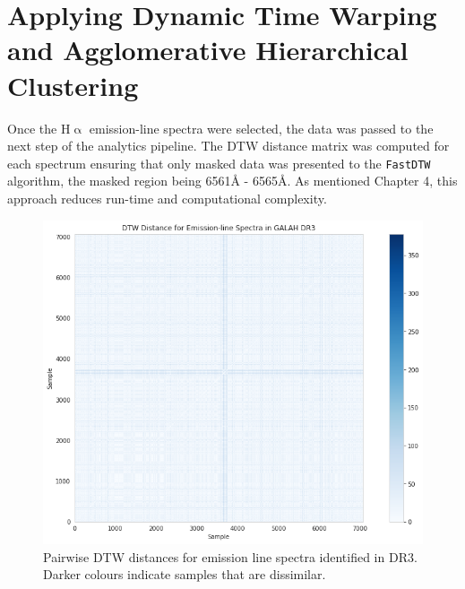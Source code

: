 \section{Applying Dynamic Time Warping and Agglomerative Hierarchical Clustering}

Once the H$\upalpha$ emission-line spectra were selected, the data was passed to the next step of the analytics pipeline. The DTW distance matrix was computed for each spectrum ensuring that only masked data was presented to the \texttt{FastDTW} algorithm, the masked region being 6561\r{A} - 6565\r{A}\cite{traven2017galah}. As mentioned Chapter 4, this approach reduces run-time and computational complexity. 

\begin{figure}[!htb]
\centering
\includegraphics[scale=0.50]{figures/dtw distances dr3.png}
\caption{Pairwise DTW distances for emission line spectra identified in DR3. Darker colours indicate samples that are dissimilar.}
\end{figure}

